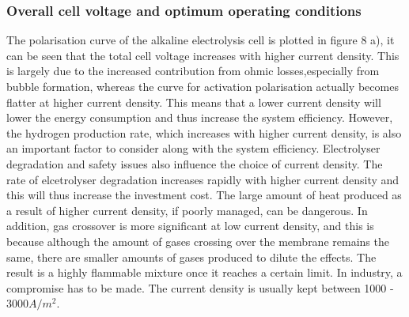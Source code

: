 \subsubsection{Overall cell voltage and optimum operating conditions}
The polarisation curve of the alkaline electrolysis cell is plotted in figure 8 a), it can be seen that the total cell voltage increases with higher current density. This is largely due to the increased contribution from ohmic losses,especially from bubble formation, whereas the curve for activation polarisation actually becomes flatter at higher current density. This means that a lower current density will lower the energy consumption and thus increase the system efficiency. However, the hydrogen production rate, which increases with higher current density,  is also an important factor to consider along with the system efficiency.  Electrolyser degradation and safety issues also influence the choice of current density. The rate of elcetrolyser degradation increases rapidly with higher current density and this will thus increase the investment cost. The large amount of heat produced as a result of higher current density, if poorly managed, can be dangerous. In addition, gas crossover is more significant at low current density, and this is because although the amount of gases crossing over the membrane remains the same, there are smaller amounts of gases produced to dilute the effects. The result is a highly flammable mixture once it reaches a certain limit. In industry, a compromise has to be made. The current density is usually kept between 1000 - 3000$A/m^2$. \cite{currentdensity}\cite{currentdensity2}

